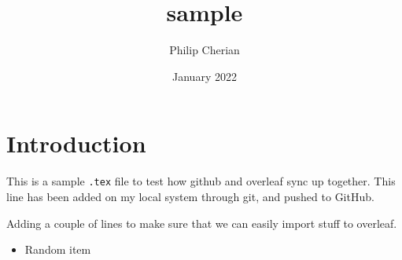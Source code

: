 \documentclass{article}
\title{sample}
\author{Philip Cherian}
\date{January 2022}
\begin{document}
\maketitle

\section{Introduction}

This is a sample \texttt{.tex} file to test how github and overleaf sync up together. This line has been added on my local system through git, and pushed to GitHub.

Adding a couple of lines to make sure that we can easily import stuff to overleaf.

\begin{itemize}
\item Random item
\end{itemize}
\end{document}
